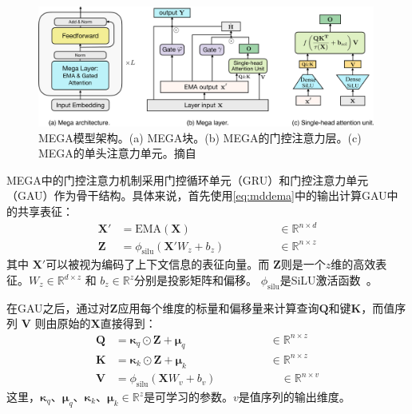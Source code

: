 \begin{figure}[!t]
\centering
\includegraphics[width=0.99\textwidth]{figs/mega/model.pdf}
\caption{MEGA模型架构。(a) MEGA块。(b) MEGA的门控注意力层。(c) MEGA的单头注意力单元。摘自~\cite{ma2023mega}}
\label{fig:arch}
\end{figure}

\label{subsubsec:mega}
MEGA中的门控注意力机制采用门控循环单元（GRU\cite{cho2014properties}）和门控注意力单元（GAU\cite{hua2022transformer}）作为骨干结构。具体来说，首先使用\eqref{eq:mddema}中的输出计算GAU中的共享表征：
\begin{align}
\boldsymbol{X}' & = \mathrm{EMA}(\boldsymbol{X}) \qquad & \qquad \in \mathbb{R}^{n\times d} \\
\boldsymbol{Z} & = \phi_{\mathrm{silu}}(\boldsymbol{X}' W_z + b_z) \qquad & \qquad \in \mathbb{R}^{n\times z} \label{eq:z}
\end{align}
其中 $\boldsymbol{X}'$可以被视为编码了上下文信息的表征向量。而
$\boldsymbol{Z}$则是一个$z$维的高效表征。$W_z \in \mathbb{R}^{d\times z}$ 和 $b_z \in \mathbb{R}^{z}$分别是投影矩阵和偏移。
$\phi_{\mathrm{silu}}$是SiLU激活函数~\cite{ramachandran2017swish}。


在GAU之后，通过对$\boldsymbol{Z}$应用每个维度的标量和偏移量来计算查询$\boldsymbol{Q}$和键$\boldsymbol{K}$，而值序列 $\boldsymbol{V}$ 则由原始的$\boldsymbol{X}$直接得到：
\begin{align}
\boldsymbol{Q} & = \boldsymbol{\kappa}_q \odot \boldsymbol{Z} + \boldsymbol{\mu}_q \qquad & \qquad \in \mathbb{R}^{n\times z} \label{eq:query} \\
\boldsymbol{K} & = \boldsymbol{\kappa}_k \odot \boldsymbol{Z} + \boldsymbol{\mu}_k \qquad & \qquad \in \mathbb{R}^{n\times z} \\
\boldsymbol{V} & = \phi_{\mathrm{silu}}(\boldsymbol{X} W_v + b_v) \qquad & \quad \qquad \in \mathbb{R}^{n\times v} \label{eq:value}
\end{align}
这里，$\boldsymbol{\kappa}_q$、$\boldsymbol{\mu}_q$、$\boldsymbol{\kappa}_k$、$\boldsymbol{\mu}_k \in \mathbb{R}^{z}$是可学习的参数。$v$是值序列的输出维度。


